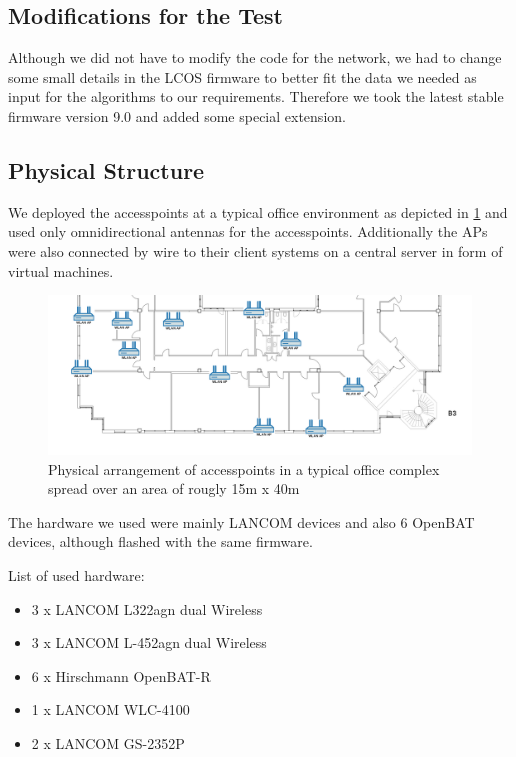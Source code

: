     \subsection{Modifications for the Test}
      Although we did not have to modify the code for the network, we had to change some small details in the LCOS firmware to better fit the data we needed as input for
      the algorithms to our requirements. Therefore we took the latest stable firmware version 9.0 and added some special extension.
   
\newpage
   
    \subsection{Physical Structure}
      We deployed the accesspoints at a typical office environment as depicted in \ref{fig:2ndfloor} and used only omnidirectional antennas for the accesspoints.
      Additionally the APs were also connected by wire to their client systems on a central server in form of virtual machines.
      
      \begin{figure}[h!]
	\centering
	\includegraphics[width=\columnwidth]{figures/Lancom-flur-withaps}
	\caption{Physical arrangement of accesspoints in a typical office complex spread over an area of rougly 15m x 40m}
	\label{fig:2ndfloor}
      \end{figure}
      
      The hardware we used were mainly LANCOM devices and also 6 OpenBAT devices, although flashed with the same firmware.
     
      List of used hardware:
      \begin{itemize}
	\item 3 x LANCOM L322agn dual Wireless \cite{lancom}
	\item 3 x LANCOM L-452agn dual Wireless
	\item 6 x Hirschmann OpenBAT-R
	\item 1 x LANCOM WLC-4100
	\item 2 x LANCOM GS-2352P
      \end{itemize}
      

